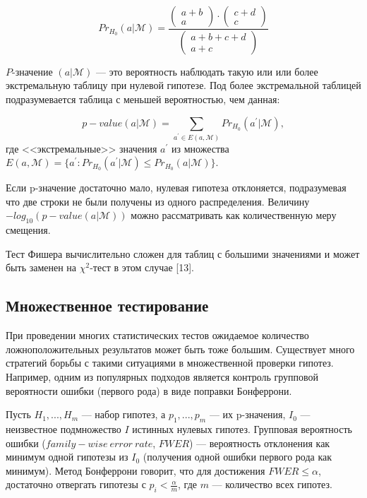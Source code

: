 $$Pr_{H_0}(a|\mathcal{M}) = \frac {\begin{pmatrix} a + b \\ a \end{pmatrix} \cdot \begin{pmatrix} c + d \\ c \end{pmatrix}} {\begin{pmatrix} a + b + c + d \\ a + c \end{pmatrix}}$$

$P$-значение $(a|\mathcal{M})$ --- это вероятность наблюдать такую или или более экстремальную таблицу при нулевой гипотезе. Под более экстремальной таблицей подразумевается таблица с меньшей вероятностью, чем данная:

$$ p{-}value (a|\mathcal{M}) =  \sum_{a^{'} \in E(a, \mathcal{M})} Pr_{H_0}(a^{'}|\mathcal{M}),$$ где <<экстремальные>> значения $a^{'}$ из множества $E(a, \mathcal{M}) = \{a^{'}: Pr_{H_0}(a^{'}|\mathcal{M}) \le Pr_{H_0}(a|\mathcal{M})\}$.

Если p-значение достаточно мало, нулевая гипотеза отклоняется, подразумевая что две строки не были получены из одного распределения. Величину $-log_{10}(p{-}value(a|\mathcal{M}))$ можно рассматривать как количественную меру смещения.

Тест Фишера вычислительно сложен для таблиц с большими значениями и может быть заменен на ${\chi}^2$-тест в этом случае [13].

\subsection{Множественное тестирование}

При проведении многих статистических тестов ожидаемое количество ложноположительных результатов может быть тоже большим. Существует много стратегий борьбы с такими ситуациями в множественной проверки гипотез. Например, одним из популярных подходов является контроль групповой вероятности ошибки (первого рода) в виде поправки Бонферрони.

Пусть $H_1,..., H_m$ --- набор гипотез, а $p_1, ..., p_m$ --- их p-значения, $I_0$ --- неизвестное подмножество $I$ истинных нулевых гипотез. Групповая вероятность ошибки ($family{-}wise\ error\ rate$, $FWER$) --- вероятность отклонения как минимум одной гипотезы из $I_0$ (получения одной ошибки первого рода как минимум).  
Метод Бонферрони говорит, что для достижения $FWER \le \alpha$, достаточно отвергать гипотезы с $p_i < \frac {\alpha} {m}$, где $m$ --- количество всех гипотез.

